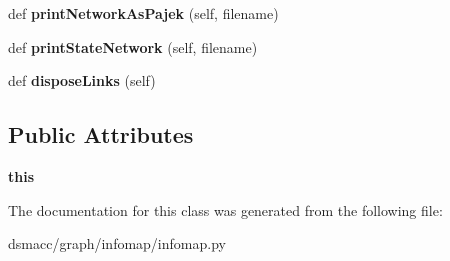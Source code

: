\begin{DoxyCompactItemize}
def {\bfseries print\+Network\+As\+Pajek} (self, filename)
\item 
\mbox{\label{classdsmacc_1_1graph_1_1infomap_1_1infomap_1_1MemNetwork_a5c495d433218b389d2568714c37b9db5}} 
def {\bfseries print\+State\+Network} (self, filename)
\item 
\mbox{\label{classdsmacc_1_1graph_1_1infomap_1_1infomap_1_1MemNetwork_a1309de76bbdb22bff6f15a057370aadb}} 
def {\bfseries dispose\+Links} (self)
\end{DoxyCompactItemize}
\subsection*{Public Attributes}
\begin{DoxyCompactItemize}
\item 
\mbox{\label{classdsmacc_1_1graph_1_1infomap_1_1infomap_1_1MemNetwork_a05c9fa31851de296a1972e2a436766f0}} 
{\bfseries this}
\end{DoxyCompactItemize}


The documentation for this class was generated from the following file\+:\begin{DoxyCompactItemize}
\item 
dsmacc/graph/infomap/infomap.\+py\end{DoxyCompactItemize}
